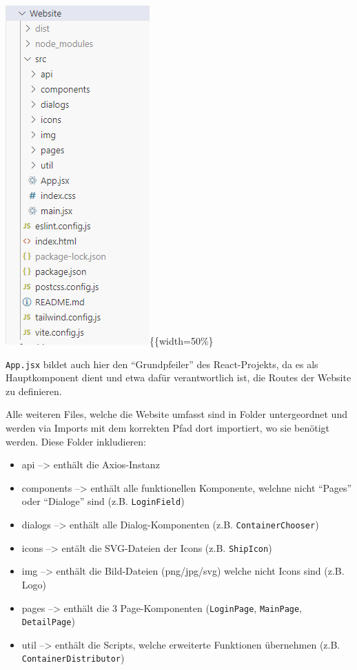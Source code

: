 \documentclass[
    headings=optiontotocandhead,%
    twoside,
    numbers=noenddot,%
    12pt, %
    titlepage, %
    parskip=full, %
    listof=leveldown, 
    numbers=noenddot, %
    a4paper,DIV=14,
    BCOR=15mm,
]{scrbook}
\newcommand{\passthrough}[1]{#1}
\providecommand{\tightlist}{%
  \setlength{\itemsep}{0pt}\setlength{\parskip}{0pt}}
\begin{document}
\includegraphics{img/Gekle/Website-Structure.png}\{\{width=50\%\}

\passthrough{\lstinline!App.jsx!} bildet auch hier den ``Grundpfeiler''
des React-Projekts, da es als Hauptkomponent dient und etwa dafür
verantwortlich ist, die Routes der Website zu definieren.

Alle weiteren Files, welche die Website umfasst sind in Folder
untergeordnet und werden via Imports mit dem korrekten Pfad dort
importiert, wo sie benötigt werden. Diese Folder inkludieren:

\begin{itemize}
\tightlist
\item
  api --\textgreater{} enthält die Axios-Instanz
\item
  components --\textgreater{} enthält alle funktionellen Komponente,
  welchne nicht ``Pages'' oder ``Dialoge'' sind (z.B.
  \passthrough{\lstinline!LoginField!})
\item
  dialogs --\textgreater{} enthält alle Dialog-Komponenten (z.B.
  \passthrough{\lstinline!ContainerChooser!})
\item
  icons --\textgreater{} entält die SVG-Dateien der Icons (z.B.
  \passthrough{\lstinline!ShipIcon!})
\item
  img --\textgreater{} enthält die Bild-Dateien (png/jpg/svg) welche
  nicht Icons sind (z.B. Logo)
\item
  pages --\textgreater{} enthält die 3 Page-Komponenten
  (\passthrough{\lstinline!LoginPage!},
  \passthrough{\lstinline!MainPage!},
  \passthrough{\lstinline!DetailPage!})
\item
  util --\textgreater{} enthält die Scripts, welche erweiterte
  Funktionen übernehmen (z.B.
  \passthrough{\lstinline!ContainerDistributor!})
\end{itemize}
\end{document}
